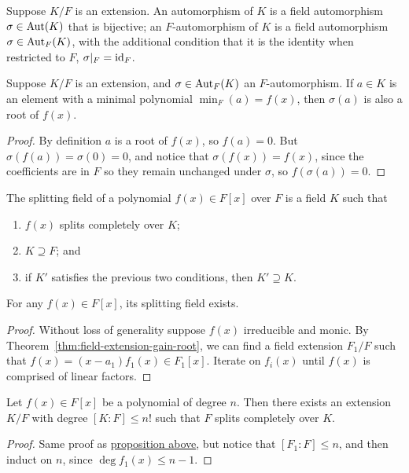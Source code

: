 \begin{definition}
    Suppose \(K/F\) is an extension.
    An automorphism of \(K\) is a field automorphism \(\sigma \in \operatorname{Aut}(K)\)
    that is bijective;
    an \(F\)-automorphism of \(K\) is a field automorphism \(\sigma \in \operatorname{Aut}_F(K)\),
    with the additional condition that it is the identity when restricted to \(F\),
    \(\sigma\vert_F = \operatorname{id}_F\).
\end{definition}
\begin{lemma}
    Suppose \(K/F\) is an extension,
    and \(\sigma \in \operatorname{Aut}_F(K)\) an \(F\)-automorphism.
    If \(a \in K\) is an element with a minimal polynomial \(\min_F(a) = f(x)\),
    then \(\sigma(a)\) is also a root of \(f(x)\).
\end{lemma}
\begin{proof}
    By definition \(a\) is a root of \(f(x)\), so \(f(a) = 0\).
    But \(\sigma(f(a)) = \sigma(0) = 0\),
    and notice that \(\sigma(f(x)) = f(x)\),
    since the coefficients are in \(F\) so they remain unchanged under \(\sigma\),
    so \(f(\sigma(a)) = 0\).
\end{proof}

\begin{definition}
    The splitting field of a polynomial \(f(x) \in F[x]\) over \(F\)
    is a field \(K\) such that
    \begin{enumerate}[label={(\roman*)}, itemsep=0mm]
        \item \(f(x)\) splits completely over \(K\);
        \item \(K \supseteq F\); and
        \item if \(K'\) satisfies the previous two conditions,
            then \(K' \supseteq K\).
    \end{enumerate}
\end{definition}
\begin{proposition}\label{prop:splitting-field-existence}
    For any \(f(x) \in F[x]\), its splitting field exists.
\end{proposition}
\begin{proof}
    Without loss of generality suppose \(f(x)\) irreducible and monic.
    By Theorem~\ref{thm:field-extension-gain-root},
    we can find a field extension \(F_1/F\)
    such that \(f(x) = (x-a_1)f_1(x) \in F_1[x]\).
    Iterate on \(f_i(x)\) until \(f(x)\) is comprised of linear factors.
\end{proof}
\begin{corollary}
    Let \(f(x) \in F[x]\) be a polynomial of degree \(n\).
    Then there exists an extension \(K/F\) with degree \([K:F] \leq n!\)
    such that \(F\) splits completely over \(K\).
\end{corollary}
\begin{proof}
    Same proof as \hyperref[prop:splitting-field-existence]{proposition above},
    but notice that \([F_1:F] \leq n\),
    and then induct on \(n\), since \(\deg f_1(x) \leq n-1\).
\end{proof}

